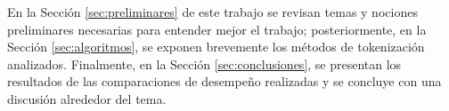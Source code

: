 
En la Sección \ref{sec:preliminares} de este trabajo se revisan temas y
nociones preliminares necesarias para entender mejor el trabajo; posteriormente,
en la Sección \ref{sec:algoritmos}, se exponen brevemente los métodos de
tokenización analizados. Finalmente, en la Sección \ref{sec:conclusiones}, se
presentan los resultados de las comparaciones de desempeño realizadas y se
concluye con una discusión alrededor del tema.



